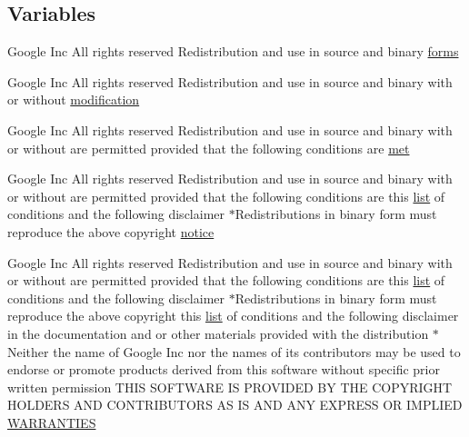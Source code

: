 \subsection*{Variables}
\begin{DoxyCompactItemize}
\item 
Google Inc All rights reserved Redistribution and use in source and binary \hyperlink{COPYING_8txt_a3a516dc4778586fff0d0168e57695086}{forms}
\item 
Google Inc All rights reserved Redistribution and use in source and binary with or without \hyperlink{COPYING_8txt_a89bb569a92fb501f1f24801a1783986c}{modification}
\item 
Google Inc All rights reserved Redistribution and use in source and binary with or without are permitted provided that the following conditions are \hyperlink{COPYING_8txt_a7fcad91ae03c073e2d86b0306333f44b}{met}
\item 
Google Inc All rights reserved Redistribution and use in source and binary with or without are permitted provided that the following conditions are this \hyperlink{CMakeLists_8txt_a548e427ae9357a6f3536cff3ca23efda}{list} of conditions and the following disclaimer $\ast$Redistributions in binary form must reproduce the above copyright \hyperlink{COPYING_8txt_a24d0b31252030c0ecf84349658ede5de}{notice}
\item 
Google Inc All rights reserved Redistribution and use in source and binary with or without are permitted provided that the following conditions are this \hyperlink{CMakeLists_8txt_a548e427ae9357a6f3536cff3ca23efda}{list} of conditions and the following disclaimer $\ast$Redistributions in binary form must reproduce the above copyright this \hyperlink{CMakeLists_8txt_a548e427ae9357a6f3536cff3ca23efda}{list} of conditions and the following disclaimer in the documentation and or other materials provided with the distribution $\ast$Neither the name of Google Inc nor the names of its contributors may be used to endorse or promote products derived from this software without specific prior written permission T\+H\+IS S\+O\+F\+T\+W\+A\+RE IS P\+R\+O\+V\+I\+D\+ED BY T\+HE C\+O\+P\+Y\+R\+I\+G\+HT H\+O\+L\+D\+E\+RS A\+ND C\+O\+N\+T\+R\+I\+B\+U\+T\+O\+RS AS IS A\+ND A\+NY E\+X\+P\+R\+E\+SS OR I\+M\+P\+L\+I\+ED \hyperlink{COPYING_8txt_ac62ff2f8b2f565a26b35ecca12f17f4a}{W\+A\+R\+R\+A\+N\+T\+I\+ES}
\item 

\end{DoxyCompactItemize}
